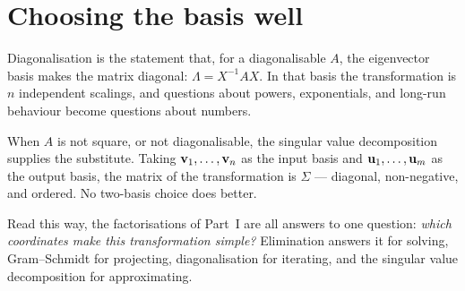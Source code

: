 
\section{Choosing the basis well}

Diagonalisation is the statement that, for a diagonalisable \(A\), the
eigenvector basis makes the matrix diagonal:
\(\Lambda=X^{-1}AX\). In that basis the transformation is \(n\) independent
scalings, and questions about powers, exponentials, and long-run behaviour become
questions about numbers.

When \(A\) is not square, or not diagonalisable, the singular value
decomposition supplies the substitute. Taking \(\mathbf{v}_1,\ldots,\mathbf{v}_n\) as
the input basis and \(\mathbf{u}_1,\ldots,\mathbf{u}_m\) as the output basis, the
matrix of the transformation is \(\Sigma\) --- diagonal, non-negative, and
ordered. No two-basis choice does better.

\begin{remark}
Read this way, the factorisations of Part~I are all answers to one question:
\emph{which coordinates make this transformation simple?} Elimination answers it
for solving, Gram--Schmidt for projecting, diagonalisation for iterating, and
the singular value decomposition for approximating.
\end{remark}
